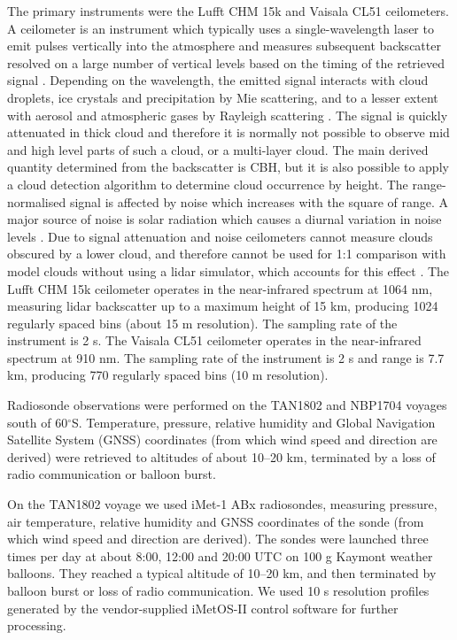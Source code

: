 The primary instruments were the Lufft CHM 15k and Vaisala CL51 ceilometers. A
ceilometer is an instrument which typically uses a single-wavelength laser to
emit pulses vertically into the atmosphere and measures subsequent backscatter
resolved on a large number of vertical levels based on the timing of the
retrieved signal \citep{emeis2010}. Depending on the wavelength, the emitted
signal interacts with cloud droplets, ice crystals and precipitation by Mie
scattering, and to a lesser extent with aerosol and atmospheric gases by
Rayleigh scattering \citep{bohren2008}. The signal is quickly attenuated in
thick cloud and therefore it is normally not possible to observe mid and high
level parts of such a cloud, or a multi-layer cloud. The main derived quantity
determined from the backscatter is CBH, but it is also possible to apply a cloud
detection algorithm to determine cloud occurrence by height. The
range-normalised signal is affected by noise which increases with the square of
range. A major source of noise is solar radiation which causes a diurnal
variation in noise levels \citep{kotthaus2016}. Due to signal attenuation and
noise ceilometers cannot measure clouds obscured by a lower cloud, and therefore
cannot be used for 1:1 comparison with model clouds without using a lidar
simulator, which accounts for this effect \citep{chepfer2008}. The Lufft CHM 15k
ceilometer operates in the near-infrared spectrum at 1064 nm, measuring lidar
backscatter up to a maximum height of 15 \unit{km}, producing 1024 regularly
spaced bins (about 15 m resolution). The sampling rate of the instrument is 2
\unit{s}. The Vaisala CL51 ceilometer operates in the near-infrared spectrum at
910 nm. The sampling rate of the instrument is 2 \unit{s} and range is 7.7
\unit{km}, producing 770 regularly spaced bins (10 m resolution).

Radiosonde observations were performed on the TAN1802 and NBP1704 voyages south
of 60$^\circ$S.  Temperature, pressure, relative humidity and Global Navigation Satellite System (GNSS) coordinates
(from which wind speed and direction are derived) were retrieved to altitudes
of about 10--20 \unit{km}, terminated by a loss of radio communication or
balloon burst.

On the TAN1802 voyage we used iMet-1 ABx radiosondes, measuring pressure,
air temperature, relative humidity and GNSS coordinates of the sonde (from
which wind speed and direction are derived). The sondes were launched three
times per day at about 8:00, 12:00 and 20:00 UTC on 100 \unit{g} Kaymont
weather balloons.  They reached a typical altitude of 10--20 \unit{km}, and
then terminated by balloon burst or loss of radio communication. We used 10
\unit{s} resolution profiles generated by the vendor-supplied iMetOS-II control
software for further processing.

